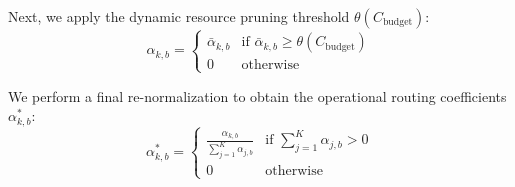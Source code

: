 Next, we apply the dynamic resource pruning threshold $\theta(C_{\text{budget}})$:
\begin{equation}
\alpha_{k, b} = \begin{cases} \bar{\alpha}_{k, b} & \text{if } \bar{\alpha}_{k, b} \ge \theta(C_{\text{budget}}) \\ 0 & \text{otherwise} \end{cases}
\label{eq:gating_prune}
\end{equation}

We perform a final re-normalization to obtain the operational routing coefficients $\alpha^*_{k, b}$:
\begin{equation}
\alpha^*_{k, b} = \begin{cases} \frac{\alpha_{k, b}}{\sum_{j=1}^K \alpha_{j, b}} & \text{if } \sum_{j=1}^K \alpha_{j, b} > 0 \\ 0 & \text{otherwise} \end{cases}
\label{eq:final_alpha}
\end{equation}

